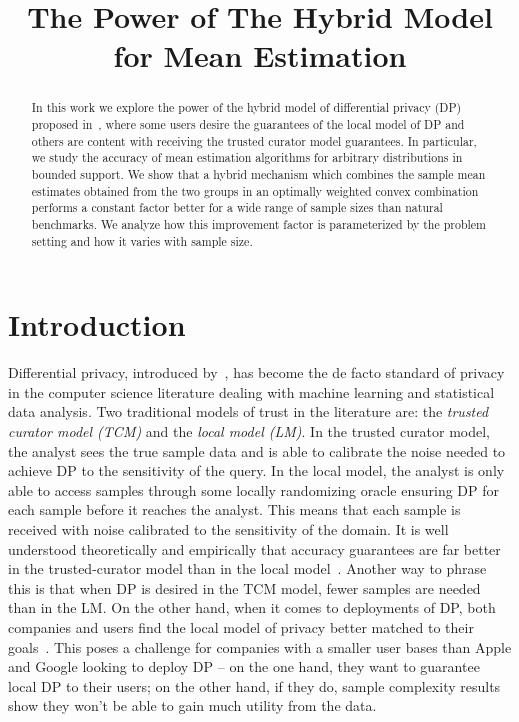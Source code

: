 \documentclass{article}
\title{The Power of The Hybrid Model for Mean Estimation}
\theoremstyle{plain}
\begin{document}
\maketitle

\begin{abstract}
In this work we explore the power of the hybrid model of differential privacy (DP) proposed in~\cite{blender}, where some users desire the guarantees of the local model of DP and others are content with receiving the trusted curator model guarantees. In particular, we study the accuracy of mean estimation algorithms for arbitrary distributions in bounded support. We show that a hybrid mechanism which combines the sample mean estimates obtained from the two groups in an optimally weighted convex combination performs a constant factor better for a wide range of sample sizes than natural benchmarks. We analyze how this improvement factor is parameterized by the problem setting and how it varies with sample size. 
\end{abstract}

\section{Introduction}
Differential privacy, introduced by~\cite{dmns06}, has become the de facto standard of privacy in the computer science literature dealing with machine learning and statistical data analysis. Two traditional models of trust in the literature are: the \textit{trusted curator model (TCM)} and the \textit{local model (LM)}. In the trusted curator model, the analyst sees the true sample data and is able to calibrate the noise needed to achieve DP to the sensitivity of the query. In the local model, the analyst is only able to access samples through some locally randomizing oracle ensuring DP for each sample before it reaches the analyst. This means that each sample is received with noise calibrated to the sensitivity of the domain. It is well understood theoretically and empirically that accuracy guarantees are far better in the trusted-curator model than in the local model~\cite{kairouz2014, bassily2015local, duchi, bittau2017prochlo, fanti2016building}. Another way to phrase this is that when DP is desired in the TCM model, fewer samples are needed than in the LM. On the other hand, when it comes to deployments of DP, both companies and users find the local model of privacy better matched to their goals~\cite{wired, pew2015privacy}. This poses a challenge for companies with a smaller user bases than Apple and Google looking to deploy DP -- on the one hand, they want to guarantee local DP to their users; on the other hand, if they do, sample complexity results show they won't be able to gain much utility from the data.
\end{document}
